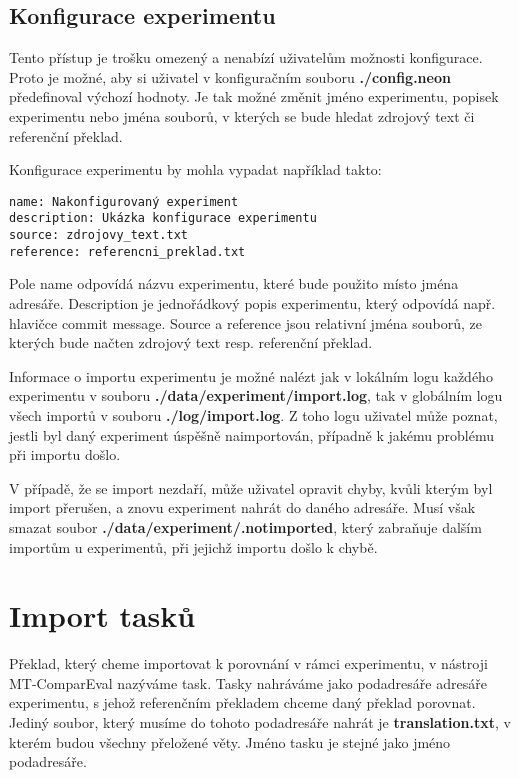 \subsection{Konfigurace experimentu}
Tento přístup je trošku omezený a nenabízí uživatelům možnosti konfigurace.
Proto je možné,
  aby si uživatel v konfiguračním souboru \textbf{./config.neon} předefinoval výchozí hodnoty.
Je tak možné změnit jméno experimentu, popisek experimentu nebo jména souborů,
  v kterých se bude hledat zdrojový text či referenční překlad.

Konfigurace experimentu by mohla vypadat například takto: \\

\begin{verbatim}
name: Nakonfigurovaný experiment
description: Ukázka konfigurace experimentu
source: zdrojovy_text.txt
reference: referencni_preklad.txt
\end{verbatim}

Pole name odpovídá názvu experimentu, které bude použito místo jména adresáře.
Description je jednořádkový popis experimentu,
  který odpovídá např. hlavičce commit message.
Source a reference jsou relativní jména souborů,
  ze kterých bude načten zdrojový text resp. referenční překlad.

Informace o importu experimentu je možné nalézt
  jak v lokálním logu každého experimentu v souboru \textbf{./data/experiment/import.log},
  tak v globálním logu všech importů v souboru \textbf{./log/import.log}.
Z toho logu uživatel může poznat,
  jestli byl daný experiment úspěšně naimportován,
  případně k jakému problému při importu došlo.

V případě, že se import nezdaří,
  může uživatel opravit chyby,
  kvůli kterým byl import přerušen,
  a znovu experiment nahrát do daného adresáře.
Musí však smazat soubor \textbf{./data/experiment/.notimported},
  který zabraňuje dalším importům u experimentů,
  při jejichž importu došlo k chybě.


\section{Import tasků}
Překlad,
  který cheme importovat k porovnání v rámci experimentu,
  v nástroji MT-ComparEval nazýváme task.
Tasky nahráváme jako podadresáře adresáře experimentu,
  s jehož referenčním překladem chceme daný překlad porovnat.
Jediný soubor, který musíme do tohoto podadresáře nahrát je \textbf{translation.txt},
  v kterém budou všechny přeložené věty.
Jméno tasku je stejné jako jméno podadresáře.

